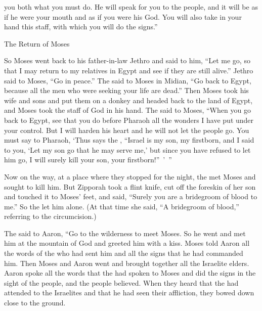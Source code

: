 {you both what
you must do.
He
will speak
for you to
the people,
and it will be
as if he were your mouth
and as if you
were
his God.
You will also take
in your hand
this
staff,
with which
you will do
the signs.”
\par }{\SH The Return of Moses
\par }{\PP {}So Moses
went
back
to
his father-in-law
Jethro
and said
to him, “Let me go,
so that I may return
to
my relatives
in Egypt
and see
if they are still
alive.”
Jethro
said
to Moses,
“Go
in peace.”
The
{}
said
to
Moses
in Midian,
“Go
back
to Egypt,
because
all
the men
who were seeking
your life
are dead.”
Then
Moses
took
his wife
and sons
and put
them on
a donkey
and headed
back
to the land
of Egypt,
and Moses
took
the
staff
of God
in his hand.
The
{}
said
to
Moses,
“When you go
back
to Egypt,
see
that
you do
before
Pharaoh
all
the wonders
I have put
under your control.
But I
will harden
his heart
and he will not
let
the
people go.
You must say
to
Pharaoh,
‘Thus
says
the {}, “Israel
is my son,
my firstborn,
and I said
to
you, ‘Let
my son
go that he may serve
me,’ but since you have refused
to let him
go, I
will surely kill
your son,
your firstborn!” ’ ”
\par }{\PP {}Now
on the way,
at a place where they stopped
for the night, the
{}
met
Moses and sought
to kill him.
But Zipporah
took
a flint
knife, cut off
the foreskin
of her son
and touched
it to Moses’ feet,
and said,
“Surely
you
are a bridegroom
of blood to me.”
So the
{} let
him alone.
(At that time
she said,
“A bridegroom
of blood,”
referring to the circumcision.)
\par }{\PP {}The
{}
said
to
Aaron,
“Go
to the wilderness
to meet
Moses.
So he went
and met
him at the mountain
of God
and greeted him with a kiss.
Moses
told
Aaron
all
the words
of the {}
who had
sent
him and all
the signs
that
he had
commanded him.
Then Moses
and Aaron
went
and brought together
all
the Israelite
elders.
Aaron
spoke
all
the words
that
the {}
had spoken
to
Moses
and did
the signs
in the sight
of the people,
and the people
believed.
When they heard
that
the {}
had attended
to the Israelites
and that
he had seen
their affliction,
they bowed down close to the ground.


}
